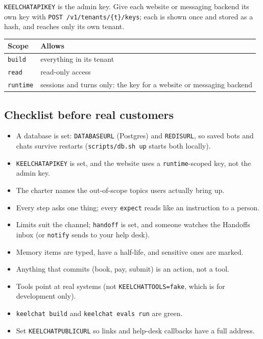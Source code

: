 \documentclass[11pt,a4paper]{article}
\newcommand{\codeus}{\textunderscore\allowbreak}
\newcommand{\code}[1]{{\renewcommand{\_}{\codeus}\texttt{\upshape #1}}}
\newcommand{\key}[1]{{\renewcommand{\_}{\codeus}\texttt{\color{ckey}#1}}}
\begin{document}
\code{KEELCHAT\_API\_KEY} is the admin key. Give each website or messaging backend its own key with
\code{POST /v1/tenants/\{t\}/keys}; each is shown once and stored as a hash, and reaches only its own tenant.

\begin{center}
\small
\begin{tabularx}{0.8\textwidth}{@{}L{2.4cm}Y@{}}
\toprule
\textbf{Scope} & \textbf{Allows} \\
\midrule
\code{build} & everything in its tenant \\
\code{read} & read-only access \\
\code{runtime} & sessions and turns only: the key for a website or messaging backend \\
\bottomrule
\end{tabularx}
\end{center}

\subsection{Checklist before real customers}

\begin{tcolorbox}[enhanced,colback=white,colframe=keel,arc=3pt,boxrule=0.6pt,left=8pt,right=8pt]
\small
\begin{itemize}[label={$\square$},leftmargin=1.4em,itemsep=0.25em]
  \item A database is set: \code{DATABASE\_URL} (Postgres) and \code{REDIS\_URL}, so saved bots and chats survive
    restarts (\code{scripts/db.sh up} starts both locally).
  \item \code{KEELCHAT\_API\_KEY} is set, and the website uses a \code{runtime}-scoped key, not the admin key.
  \item The charter names the out-of-scope topics users actually bring up.
  \item Every step asks one thing; every \code{expect} reads like an instruction to a person.
  \item Limits suit the channel; \key{handoff} is set, and someone watches the Handoffs inbox (or \code{notify}
    sends to your help desk).
  \item Memory items are typed, have a half-life, and sensitive ones are marked.
  \item Anything that commits (book, pay, submit) is an action, not a tool.
  \item Tools point at real systems (not \code{KEELCHAT\_TOOLS=fake}, which is for development only).
  \item \code{keelchat build} and \code{keelchat evals run} are green.
  \item Set \code{KEELCHAT\_PUBLIC\_URL} so links and help-desk callbacks have a full address.
\end{itemize}
\end{tcolorbox}
\end{document}
